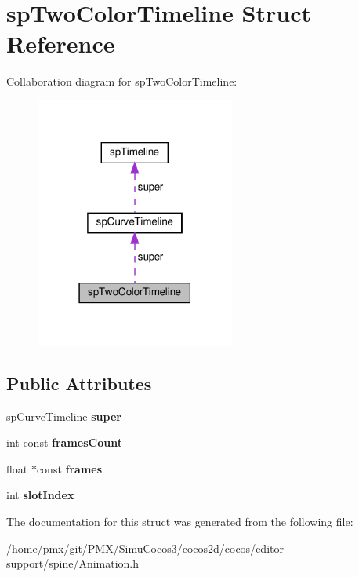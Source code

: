 \hypertarget{structspTwoColorTimeline}{}\section{sp\+Two\+Color\+Timeline Struct Reference}
\label{structspTwoColorTimeline}


Collaboration diagram for sp\+Two\+Color\+Timeline\+:
\nopagebreak
\begin{figure}[H]
\begin{center}
\leavevmode
\includegraphics[width=186pt]{structspTwoColorTimeline__coll__graph}
\end{center}
\end{figure}
\subsection*{Public Attributes}
\begin{DoxyCompactItemize}
\item 
\mbox{\label{structspTwoColorTimeline_a3d52bea3d21445408769fbd2874bc628}} 
\hyperlink{structspCurveTimeline}{sp\+Curve\+Timeline} {\bfseries super}
\item 
\mbox{\label{structspTwoColorTimeline_a50b74601d0c5c304fd0ef79700939e6c}} 
int const {\bfseries frames\+Count}
\item 
\mbox{\label{structspTwoColorTimeline_a52f40f1c00b6a9f49da6467da1c3d801}} 
float $\ast$const {\bfseries frames}
\item 
\mbox{\label{structspTwoColorTimeline_a56aa765f5db66090d140490e6327f46f}} 
int {\bfseries slot\+Index}
\end{DoxyCompactItemize}


The documentation for this struct was generated from the following file\+:\begin{DoxyCompactItemize}
\item 
/home/pmx/git/\+P\+M\+X/\+Simu\+Cocos3/cocos2d/cocos/editor-\/support/spine/Animation.\+h\end{DoxyCompactItemize}
